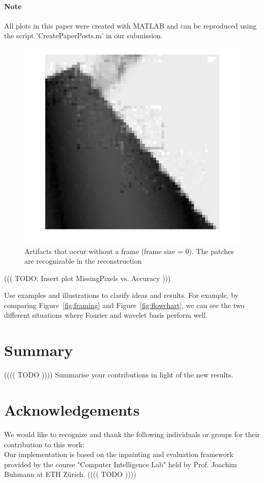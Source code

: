 \documentclass[10pt,conference,compsocconf]{IEEEtran}
\begin{document}
\paragraph{Note}
All plots in this paper were created with MATLAB and can be reproduced using the script 'CreatePaperPosts.m' in our submission.\\

\begin{figure}[tbp]
  \centering
  \includegraphics[width=\columnwidth]{images/boundaryArtifact_noframe.png}
  \caption{Artifacts that occur without a frame (frame size = 0). The patches are recognizable in the reconstruction}
  \label{fig:boundaryArtifacts}
\end{figure}

((( TODO: Insert plot MissingPixels vs. Accuracy )))

Use examples and illustrations to clarify ideas and results. For
example, by comparing Figure~\ref{fig:framing} and
Figure~\ref{fig:flowchart}, we can see the two different
situations where Fourier and wavelet basis perform well. 

\section{Summary}
(((( TODO ))))
  Summarise your contributions in light of the new
  results.
  

\section*{Acknowledgements}
We would like to recognize and thank the following individuals or groups for their contribution to this work:\\
Our implementation is based on the inpainting and evaluation framework provided by the course "Computer Intelligence Lab" held by Prof. Joachim Buhmann at ETH Zürich.
(((( TODO ))))




\end{document}
